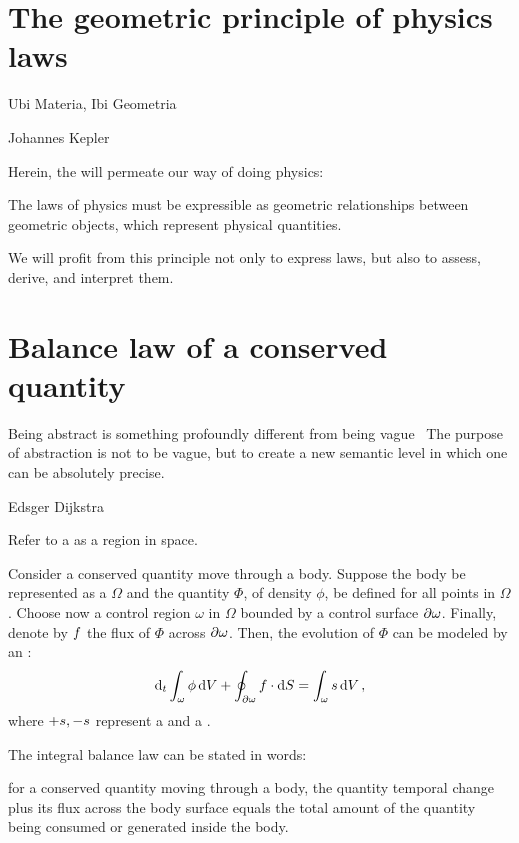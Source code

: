 
\section{The geometric principle of physics laws}
\label{sec:geometric-principle-physics-laws}
%
\epigraph{Ubi Materia, Ibi Geometria}{Johannes Kepler}

Herein, the  will permeate our way of doing physics:~\cite[chap. 1, p. iii]{thorne2013}
%
\begin{axiom}\label{axm:geometric-principle-physics-laws}
  The laws of physics must be expressible as geometric relationships between geometric objects, which represent physical quantities.
\end{axiom}
%
We will profit from this principle not only to express laws, but also to assess, derive, and interpret them.


\section{Balance law of a conserved quantity}
\label{sec:balance-law-conserved-quantity}
%
\epigraph{Being abstract is something profoundly different from being vague \dotsq\ The purpose of abstraction is not to be vague, but to create a new semantic level in which one can be absolutely precise.}{Edsger Dijkstra}

\begin{definition}
  Refer to a  as a region in space.
\end{definition}

\begin{observation}\label{obs:balance-law-conserved-quantity}
  Consider a conserved quantity move through a body. Suppose the body be represented as a  $\Omega$ and the quantity $\Phi$, of density $\phi$, be defined for all points in  $\Omega$. Choose now a control region $\omega$ in $\Omega$ bounded by a control surface $\partial\omega$. Finally, denote by $f$ the flux of $\Phi$ across $\partial\omega$. Then, the evolution of $\Phi$ can be modeled by an :
  \begin{equation}\label{eqn:integral-balance-law}
    \mathrm{d}_{t}\int_{\omega}\phi\,\mathrm{d} V
    + \oint_{\partial\omega}f\cdot\mathrm{d} S
    =
    \int_{\omega}s\,\mathrm{d} V\,,
  \end{equation}
  where $+s,-s$ represent a  and a .
\end{observation}
%
The integral balance law can be stated in words:~\cite[p. 5]{mishra2016}
%
\begin{law}
  for a conserved quantity moving through a body, the quantity temporal change plus its flux across the body surface equals the total amount of the quantity being consumed or generated inside the body.
\end{law}

